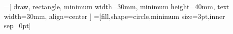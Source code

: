 \usepackage{tikz}

=[
    draw,
    rectangle,
    minimum width=30mm,
    minimum height=40mm,
    text width=30mm,
    align=center
]
=[fill,shape=circle,minimum size=3pt,inner sep=0pt]
